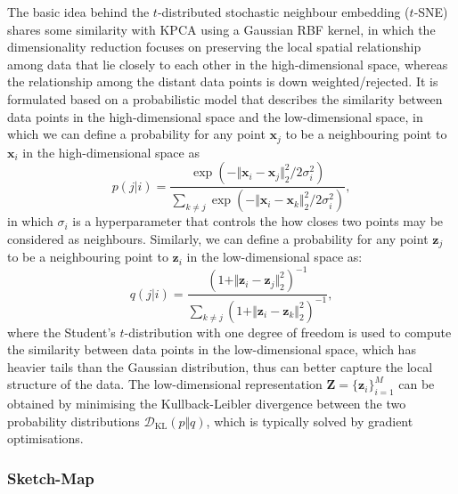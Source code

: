 The basic idea behind the $t$-distributed stochastic neighbour embedding ($t$-SNE)\cite{van2008visualizing} shares some similarity with KPCA using a Gaussian RBF kernel, in which the dimensionality reduction focuses on preserving the local spatial relationship among data that lie closely to each other in the high-dimensional space, whereas the relationship among the distant data points is down weighted/rejected. It is formulated based on a probabilistic model that describes the similarity between data points in the high-dimensional space and the low-dimensional space, in which we can define a probability for any point $\bm{x}_j$ to be a neighbouring point to $\bm{x}_i$ in the high-dimensional space as
\begin{equation}
  \label{eq:prob_high_d_distance}
  p(j|i)=\frac{\exp(-\Vert\bm{x}_i-\bm{x}_j\Vert_2^2/2\sigma_i^2)}{\sum_{k\neq j}\exp(-\Vert\bm{x}_i-\bm{x}_k\Vert_2^2/2\sigma_i^2)},
\end{equation}
in which $\sigma_i$ is a hyperparameter that controls the how closes two points may be considered as neighbours. Similarly, we can define a probability for any point $\bm{z}_j$ to be a neighbouring point to $\bm{z}_i$ in the low-dimensional space as:
\begin{equation}
  \label{eq:prob_low_d_distance}
  q(j|i)=\frac{(1+\Vert\bm{z}_i-\bm{z}_j\Vert_2^2)^{-1}}{\sum_{k\neq j}(1+\Vert\bm{z}_i-\bm{z}_k\Vert_2^2)^{-1}},
\end{equation}
where the Student's $t$-distribution with one degree of freedom is used to compute the similarity between data points in the low-dimensional space, which has heavier tails than the Gaussian distribution, thus can better capture the local structure of the data. The low-dimensional representation $\bm{Z}=\{\bm{z}_i\}_{i=1}^M$ can be obtained by minimising the Kullback-Leibler divergence between the two probability distributions $\mathcal{D}_{\mathrm{KL}}(p\Vert q)$, which is typically solved by gradient optimisations.


\subsubsection{Sketch-Map}
\label{appendix:sketch_map}

